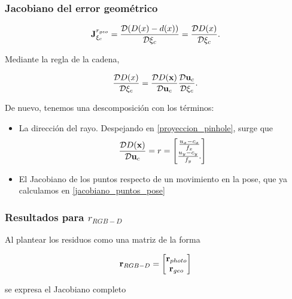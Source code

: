 \subsubsection{Jacobiano del error geométrico}

\begin{equation}
    \mathbf{J}_{\xi_c}^{r_{geo}} = \frac{\mathcal{D}(D(x) - d(x))}{\mathcal{D}\xi_c} = \frac{\mathcal{D}D(x)}{\mathcal{D}\xi_c}.
\end{equation}

Mediante la regla de la cadena,

\begin{equation}
    \frac{\mathcal{D}D(x)}{\mathcal{D}\xi_c} = \frac{\mathcal{D}D(\mathbf{x})}{\mathcal{D}\mathbf{u}_c}
    \frac{\mathcal{D}\mathbf{u}_c}{\mathcal{D}\xi_c}.
\end{equation}

De nuevo, tenemos una descomposición con los términos:

\begin{itemize}
    \item 
    La dirección del rayo. Despejando en \ref{proyeccion_pinhole}, surge que
    \begin{equation}
    \frac{\mathcal{D}D(\mathbf{x})}{\mathcal{D}\mathbf{u}_c} = r = 
    \begin{bmatrix}
        \frac{u_x - c_x}{f_x} \\
        \frac{u_y - c_y}{f_y}.
    \end{bmatrix}
    \end{equation}

    \item 
    El Jacobiano de los puntos respecto de un movimiento en la pose, que ya calculamos en \ref{jacobiano_puntos_pose}
\end{itemize}



\subsubsection{Resultados para $r_{RGB-D}$}

Al plantear los residuos como una matriz de la forma

\begin{equation}
    \mathbf{r}_{RGB-D} =
    \begin{bmatrix}
        \mathbf{r}_{photo} \\
        \mathbf{r}_{geo}
    \end{bmatrix}
\end{equation}

se expresa el Jacobiano completo

